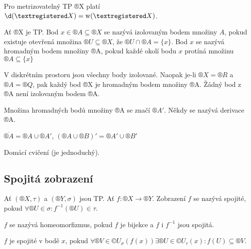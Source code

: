 \documentclass[12pt]{article}					%
\begin{document}
        \begin{poznamka}
            Pro metrizovatelný TP ®X platí $\d(®X) = \weight(®X)$.
        \end{poznamka}

        \begin{definice}
            Ať ®X je TP. Bod $x \in ®A \subseteq ®X$ se nazývá izolovaným bodem množiny $A$, pokud existuje otevřená množina $®U \subseteq ®X$, že $®U\cap ®A = \{x\}$. Bod $x$ se nazývá hromadným bodem množiny ®A, pokud každé okolí bodu $x$ protíná množinu $®A\subseteq \{x\}$
            \begin{prikladyin}
                V diskrétním prostoru jsou všechny body izolované. Naopak je-li $®X = ®R$ a $®A = ®Q$, pak každý bod ®X je hromadným bodem množiny ®A. Žádný bod z ®A není izolovaným bodem ®A.
            \end{prikladyin}

        \end{definice}

        \begin{definice}
            Množina hromadných bodů množiny ®A se značí $®A'$. Někdy se nazývá derivace ®A.
        \end{definice}

        \begin{tvrzeni}
            $\overline{®A} = ®A \cup ®A'$, $(®A \cup ®B)' = ®A' \cup ®B'$
            \begin{dukazin}
                Domácí cvičení (je jednoduchý).
            \end{dukazin}
        \end{tvrzeni}

    \subsection{Spojitá zobrazení}
        \begin{definice}
            Ať $(®X, \tau)$ a $(®Y, \sigma)$ jsou TP. Ať $f: ®X \rightarrow ®Y$. Zobrazení $f$ se nazývá spojité, pokud $\forall ®U \in \sigma: f^{-1}(®U) \in \tau$.

            $f$ se nazývá homeomorfizmus, pokud $f$ je bijekce a $f$ i $f^{-1}$ jsou spojitá.

            $f$ je spojité v bodě $x$, pokud $\forall ®V \in ©U_\sigma(f(x)) \exists ®U \in ©U_\tau(x): f(U) \subseteq ®V$.
        \end{definice}
\end{document}
